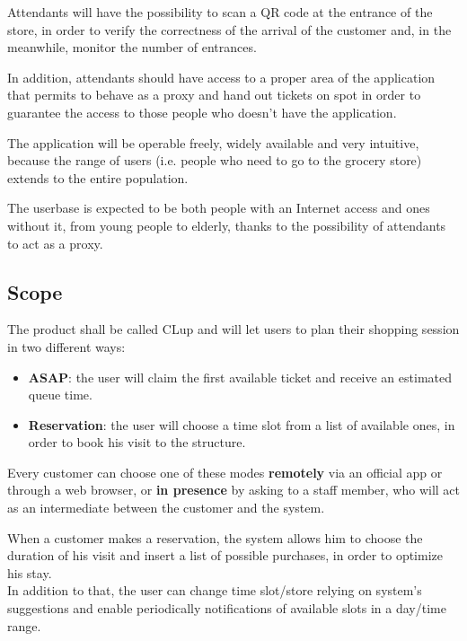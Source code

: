 \documentclass[12pt]{article}
\begin{document}
Attendants will have the possibility to scan a QR code at the entrance of the store, in order to verify the correctness of the arrival of the customer and, in the meanwhile, monitor the number of entrances.

In addition, attendants should have access to a proper area of the application that permits to behave as a proxy and hand out tickets on spot in order to guarantee the access to those people who doesn't have the application.

The application will be operable freely, widely available and very intuitive, because the range of users (i.e. people who need to go to the grocery store) extends to the entire population.

The userbase is expected to be both people with an Internet access and ones without it, from young people to elderly, thanks to the possibility of attendants to act as a proxy.

\subsection{Scope}
The product shall be called CLup and will let users to plan their shopping session in two different ways:
\begin{itemize}
    \item {\textbf{ASAP}: the user will claim the first available ticket and receive an estimated queue time.}
    \item {\textbf{Reservation}: the user will choose a time slot from a list of available ones, in order to book his visit to the structure.}
\end{itemize}

Every customer can choose one of these modes \textbf{remotely} via an official app or through a web browser, or \textbf{in presence} by asking to a staff member, who will act as an intermediate between the customer and the system.

When a customer makes a reservation, the system allows him to choose the duration of his visit and insert a list of possible purchases, in order to optimize his stay.\\

In addition to that, the user can change time slot/store relying on system's suggestions and enable periodically notifications of available slots in a day/time range.
\end{document}
